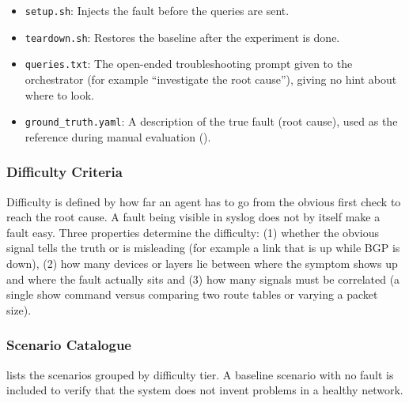 \begin{itemize}
    \item \texttt{setup.sh}: Injects the fault before the queries are sent.
    \item \texttt{teardown.sh}: Restores the baseline after the experiment is done.
    \item \texttt{queries.txt}: The open-ended troubleshooting prompt given to the
          orchestrator (for example \enquote{investigate the root cause}), giving no hint about where to look.
    \item \texttt{ground\_truth.yaml}: A description of the true fault (root cause), used
          as the reference during manual evaluation ().
\end{itemize}

\subsubsection{Difficulty Criteria}
\label{sec:difficulty-criteria}
Difficulty is defined by how far an agent has to go from the obvious first check to reach the
root cause. A fault being visible in syslog does not by itself make a fault easy. Three properties determine
the difficulty: (1) whether the obvious signal tells the truth or is misleading (for example a link that is up
while BGP is down), (2) how many devices or layers lie between where the symptom shows up and
where the fault actually sits and (3) how many signals must be correlated (a single show
command versus comparing two route tables or varying a packet size).

\subsubsection{Scenario Catalogue}
\label{sec:scenario-catalogue}
 lists the scenarios grouped by difficulty tier. A baseline scenario with no fault is
included to verify that the system does not invent problems in a healthy network.

